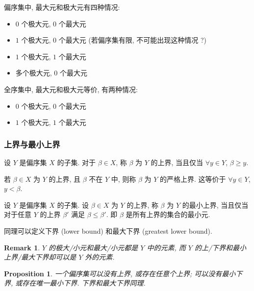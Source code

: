 \documentclass[UTF8]{ctexart}
\theoremstyle{mystyle}
\newtheorem{proposition}{Proposition}[section]
\theoremstyle{myremark}
\newtheorem*{remark}{Remark}
\theoremstyle{plain}
\begin{document}
偏序集中, 最大元和极大元有四种情况:
\begin{itemize}
    \item $ 0 $ 个极大元, $ 0 $ 个最大元
    \item $ 1 $ 个极大元, $ 0 $ 个最大元 (若偏序集有限, 不可能出现这种情况 ?)
    \item $ 1 $ 个极大元, $ 1 $ 个最大元
    \item 多个极大元, $ 0 $ 个最大元
\end{itemize}

全序集中, 最大元和极大元等价, 有两种情况:
\begin{itemize}
    \item $ 0 $ 个极大元, $ 0 $ 个最大元
    \item $ 1 $ 个极大元, $ 1 $ 个最大元
\end{itemize}


\subsubsection{上界与最小上界}
\begin{definition}
    设 $ Y $ 是偏序集 $ X $ 的子集. 对于 $ \beta \in X $, 称 $ \beta $ 为 $ Y $ 的上界, 当且仅当 $ \forall y \in Y $, $ \beta \ge y $.
\end{definition}

若 $ \beta \in X $ 为 $ Y $ 的上界, 且 $ \beta $ 不在 $ Y $ 中, 则称 $ \beta $ 为 $ Y $ 的严格上界. 这等价于 $ \forall y \in Y $, $ y < \beta $.

\begin{definition}
    设 $ Y $ 是偏序集 $ X $ 的子集. 设 $ \beta \in X $ 为 $ Y $ 的上界, 称 $ \beta $ 为 $ Y $ 的最小上界, 当且仅当对于任意 $ Y $ 的上界 $ \beta' $ 满足 $ \beta \le \beta' $. 即 $ \beta $ 是所有上界的集合的最小元.
\end{definition}

同理可以定义下界 (lower bound) 和最大下界 (greatest lower bound).

\begin{remark}
    $ Y $ 的极大/小元和最大/小元都是 $ Y $ 中的元素, 而 $ Y $ 的上/下界和最小上界/最大下界却可以是 $ Y $ 外的元素.
\end{remark}

\begin{proposition}
    一个偏序集可以没有上界, 或存在任意个上界; 可以没有最小下界, 或存在唯一最小下界. 下界和最大下界同理.
\end{proposition}
\end{document}
